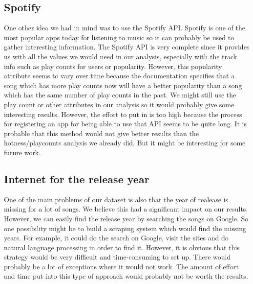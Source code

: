 \documentclass[11pt]{article}
\begin{document}
\subsection{Spotify}
One other idea we had in mind was to use the Spotify API. Spotify is one of the most
popular apps today for listening to music so it can probably be used to gather interesting information. The
Spotify API is very complete since it provides us with all the values we would need in our analysis,
especially with the track info such as play counts for users or popularity. However, this popularity
attribute seems to vary over time because the documentation specifies that a song which has more play
counts now will have a better popularity than a song which has the same number of play counts in the
past. We might still use the play count or other attributes in our analysis so it would probably give some
interesting results. However, the effort to put in is too high because the process for registering an app for
being able to use that API seems to be quite long. It is probable that this method would not give better
results than the hotness/playcounts analysis we already did. But it might be interesting for some future
work.

\subsection{Internet for the release year}
One of the main problems of our dataset is also that the year of realease is missing for a lot of songs. We believe this had a significant impact on our results. However, we can easily find the release year by searching the songs on Google. So one possibility might be to build a scraping system which would find the missing years. For example, it could do the search on Google, visit the sites and do natural language processing in order to find it. However, it is obvious that this strategy would be very difficult and time-consuming to set up. There would probably be a lot of exceptions where it would not work. The amount of effort and time put into this type of approach would probably not be worth the results. 
\end{document}
